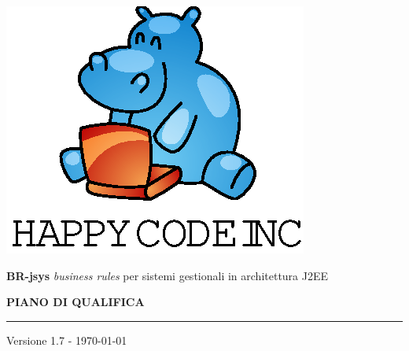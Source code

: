 \documentclass[11pt,titlepage,a4paper]{report}
\begin{document}
\newcommand{\lv}{1.7} %
\newcommand{\PianoDiProgetto}{ PianoDiProgetto.1.0.pdf }
\newcommand{\Glossario}{ Glossario.1.4.pdf }



\begin{titlepage}
\begin{center}
\vspace*{0.5in}
\includegraphics{logo.eps}
\vspace*{0.2in}

{\Large \textbf{BR-jsys}}
{\Large \emph{business rules} per sistemi gestionali in architettura J2EE } 
\vspace{2in}

\LARGE \textbf {PIANO DI QUALIFICA}
\par\rule{10cm}{0.4pt} \par {\large Versione 1.7 - \today}


\end{center}
\end{titlepage}
\vspace*{0.5in}
\end{document}
